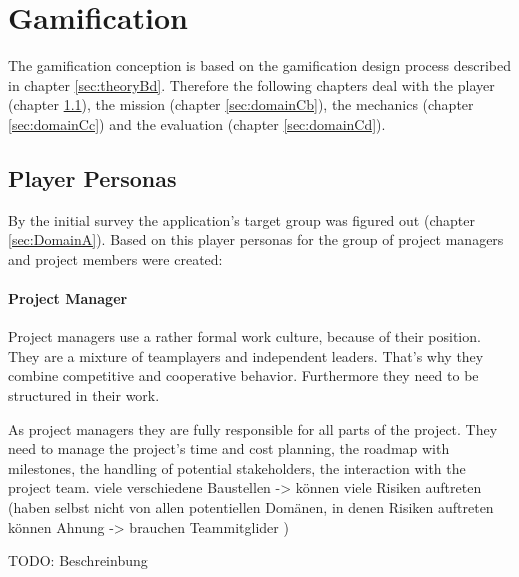 \newpage

\section{Gamification}
\label{sec:domainC}


The gamification conception is based on the gamification design process described in chapter \ref{sec:theoryBd}. Therefore the following chapters deal with the player (chapter \ref{sec:domainCa}), the mission (chapter \ref{sec:domainCb}), the mechanics (chapter \ref{sec:domainCc}) and the evaluation (chapter \ref{sec:domainCd}).

\subsection{Player Personas}
\label{sec:domainCa}

By the initial survey the application's target group was figured out (chapter \ref{sec:DomainA}). Based on this player personas for the group of project managers and project members were created:

\paragraph*{Project Manager}

Project managers use a rather formal work culture, because of their position. They are a mixture of teamplayers and independent leaders. That's why they combine competitive and cooperative behavior. Furthermore they need to be structured in their work.

As project managers they are fully responsible for all parts of the project. They need to manage the project's time and cost planning, the roadmap with milestones, the handling of potential stakeholders, the interaction with the project team.
viele verschiedene Baustellen -> können viele Risiken auftreten (haben selbst nicht von allen potentiellen Domänen, in denen Risiken auftreten können Ahnung -> brauchen Teammitglider )

TODO: Beschreinbung

